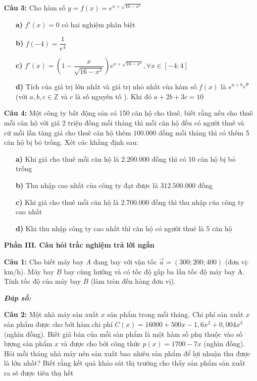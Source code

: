 \documentclass[12pt, a4paper]{article}
\begin{document}
\textbf{Câu 3: } Cho hàm số $ y = f(x) = e^{x + \sqrt{16 - x^2}} $
\vspace{-0.5cm}
	\begin{enumerate}
		\item[\textbf{a)}] $ f'(x) = 0 $ có hai nghiệm phân biệt
		\item[\textbf{b)}] $ f(-4) = \dfrac{1}{e^4} $
		\item[\textbf{c)}] $ f'(x) = \left( 1 - \dfrac{x}{\sqrt{16 - x^2}} \right) e^{x + \sqrt{16 - x^2}} , \forall x \in [-4;4] $
		\item[\textbf{d)}] Tích của giá trị lớn nhất và giá trị nhỏ nhất của hàm số $ f(x) $ là $ e^{a + b\sqrt{c}} $ (với $ a,b,c \in \mathbb{Z} $ và $ c $ là số nguyên tố ). Khi đó $ a + 2b + 3c = 10 $
	\end{enumerate}

\textbf{Câu 4: } Một công ty bất động sản có 150 căn hộ cho thuê, biết rằng nếu cho thuê mỗi căn hộ với giá 2 triệu đồng mỗi tháng thì mỗi căn hộ đều có người thuê và cứ mỗi lần tăng giá cho thuê căn hộ thêm $ 100.000 $ dồng mỗi tháng thì có thêm 5 căn hộ bị bỏ trống. Xét các khẳng định sau:
\vspace{-0.5cm}
	\begin{enumerate}
		\item[\textbf{a)}] Khi giá cho thuê mỗi căn hộ là $ 2.200.000 $ đồng thì có 10 căn hộ bị bỏ trống
		\item[\textbf{b)}] Thu nhập cao nhất của công ty đạt được là $ 312.500.000 $ đồng
		\item[\textbf{c)}] Khi giá cho thuê mỗi căn hộ là $ 2.700.000 $ đồng thì thu nhập của công ty cao nhất
		\item[\textbf{d)}] Khi thu nhập công ty cao nhất thì căn hộ có người thuê là 5 căn hộ
	\end{enumerate}
	
\textbf{Phần III. Câu hỏi trắc nghiệm trả lời ngắn}

\textbf{Câu 1: } Cho biết máy bay $ A $ đang bay với vận tốc $ \overrightarrow{a} = (300;200;400) $ (đơn vị: km/h). Máy bay $ B $ bay cùng hướng và có tốc độ gấp ba lần tốc độ máy bay A. Tính tốc độ của máy bay $ B $ (làm tròn đến hàng đơn vị).

	\vspace{-0.5 cm}
	\textit{\textbf{Đáp số: }}
	\framebox[20mm]{\rule{0pt}{4mm}}
	
\textbf{Câu 2: } Một nhà máy sản xuất $ x $ sản phẩm trong mỗi tháng. Chi phí sản xuất $ x $ sản phẩm được cho bởi hàm chi phí $ C(x) = 16000 + 500x - 1,6x^2 + 0,004x^3 $ (nghìn đồng). Biết giá bán của mỗi sản phẩm là một hàm số phụ thuộc vào số lượng sản phẩm $ x $ và được cho bởi công thức $ p(x) = 1700 - 7x $ (nghìn đồng). Hỏi mỗi tháng nhà máy nên sản xuất bao nhiêu sản phẩm để lợi nhuận thu được là lớn nhất? Biết rằng kết quả khảo sát thị trường cho thấy sản phẩm sản xuất ra sẽ được tiêu thụ hết
\end{document}
